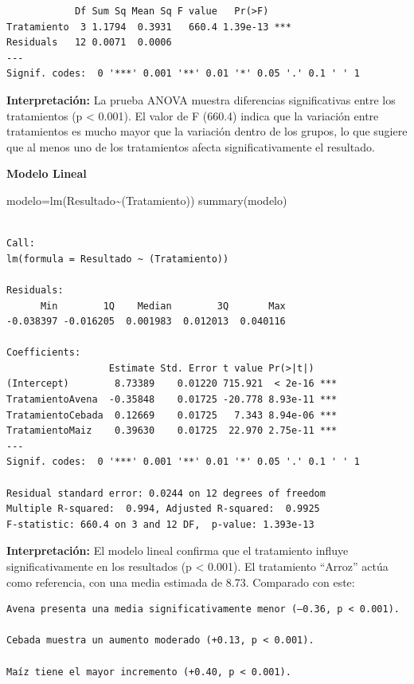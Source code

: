 \documentclass[
  letterpaper,
  DIV=11,
  numbers=noendperiod]{scrreprt}
\newenvironment{Shaded}{\begin{snugshade}}{\end{snugshade}}
\newcommand{\FunctionTok}[1]{\textcolor[rgb]{0.28,0.35,0.67}{#1}}
\newcommand{\NormalTok}[1]{\textcolor[rgb]{0.00,0.23,0.31}{#1}}
\newcommand{\OtherTok}[1]{\textcolor[rgb]{0.00,0.23,0.31}{#1}}
\newcommand{\SpecialCharTok}[1]{\textcolor[rgb]{0.37,0.37,0.37}{#1}}
\begin{document}
\begin{verbatim}
            Df Sum Sq Mean Sq F value   Pr(>F)    
Tratamiento  3 1.1794  0.3931   660.4 1.39e-13 ***
Residuals   12 0.0071  0.0006                     
---
Signif. codes:  0 '***' 0.001 '**' 0.01 '*' 0.05 '.' 0.1 ' ' 1
\end{verbatim}

\textbf{Interpretación:} La prueba ANOVA muestra diferencias
significativas entre los tratamientos (p \textless{} 0.001). El valor de
F (660.4) indica que la variación entre tratamientos es mucho mayor que
la variación dentro de los grupos, lo que sugiere que al menos uno de
los tratamientos afecta significativamente el resultado.

\textbf{Modelo Lineal}

\begin{Shaded}
\begin{Highlighting}[]
\NormalTok{modelo}\OtherTok{=}\FunctionTok{lm}\NormalTok{(Resultado}\SpecialCharTok{\textasciitilde{}}\NormalTok{(Tratamiento))}
\FunctionTok{summary}\NormalTok{(modelo)}
\end{Highlighting}
\end{Shaded}

\begin{verbatim}

Call:
lm(formula = Resultado ~ (Tratamiento))

Residuals:
      Min        1Q    Median        3Q       Max 
-0.038397 -0.016205  0.001983  0.012013  0.040116 

Coefficients:
                  Estimate Std. Error t value Pr(>|t|)    
(Intercept)        8.73389    0.01220 715.921  < 2e-16 ***
TratamientoAvena  -0.35848    0.01725 -20.778 8.93e-11 ***
TratamientoCebada  0.12669    0.01725   7.343 8.94e-06 ***
TratamientoMaiz    0.39630    0.01725  22.970 2.75e-11 ***
---
Signif. codes:  0 '***' 0.001 '**' 0.01 '*' 0.05 '.' 0.1 ' ' 1

Residual standard error: 0.0244 on 12 degrees of freedom
Multiple R-squared:  0.994, Adjusted R-squared:  0.9925 
F-statistic: 660.4 on 3 and 12 DF,  p-value: 1.393e-13
\end{verbatim}

\textbf{Interpretación:} El modelo lineal confirma que el tratamiento
influye significativamente en los resultados (p \textless{} 0.001). El
tratamiento ``Arroz'' actúa como referencia, con una media estimada de
8.73. Comparado con este:

\begin{verbatim}
Avena presenta una media significativamente menor (–0.36, p < 0.001).

Cebada muestra un aumento moderado (+0.13, p < 0.001).

Maíz tiene el mayor incremento (+0.40, p < 0.001).
\end{verbatim}
\end{document}
